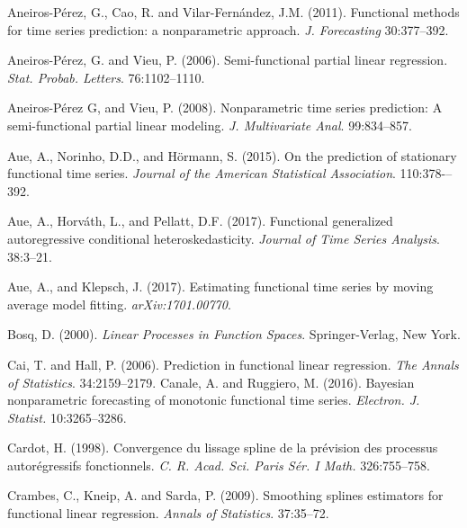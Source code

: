 \documentclass[11pt,a4paper]{article}
\begin{document}
\begin{thebibliography}{9}
Aneiros-P\'erez, G., Cao,  R. and Vilar-Fern\'andez, J.M. (2011).
Functional methods for time series prediction: a nonparametric approach.
	\emph{J. Forecasting}  30:377--392.


Aneiros-P\'erez, G. and Vieu, P. (2006). Semi-functional partial linear regression. \emph{Stat. Probab. Letters}. 76:1102--1110.

Aneiros-P\'erez G, and Vieu, P. (2008). Nonparametric time series prediction: A semi-functional partial linear modeling. \emph{J.
Multivariate Anal}. 99:834--857.

Aue, A., Norinho, D.D., and H\"ormann, S. (2015). On the prediction of stationary functional time series. \emph{Journal of the American Statistical Association}. 110:378-–392.

Aue, A., Horváth, L., and Pellatt, D.F. (2017). Functional generalized autoregressive conditional heteroskedasticity. \emph{ Journal of Time Series Analysis}. 38:3--21.

Aue, A., and Klepsch, J. (2017). Estimating functional time series by moving average model fitting. \emph{arXiv:1701.00770}.



Bosq, D. (2000). \emph{Linear Processes in Function Spaces}. Springer-Verlag, New York.




Cai, T. and Hall, P. (2006). Prediction in functional linear regression. \emph{The Annals of Statistics}. 34:2159--2179.
 Canale, A. and Ruggiero, M. (2016).
	Bayesian nonparametric forecasting of monotonic functional time series.
	\emph{Electron. J. Statist.} 	10:3265--3286.



 Cardot, H. (1998).
	Convergence du lissage spline de la pr\'evision
des processus autor\'egressifs fonctionnels.
	\emph{C. R. Acad. Sci. Paris S\'er. I Math.}
	326:755--758.


Crambes, C.,  Kneip, A. and Sarda, P. (2009).  Smoothing splines estimators for functional linear regression. \emph{Annals of Statistics}. 37:35--72.


\end{thebibliography}
\end{document}
